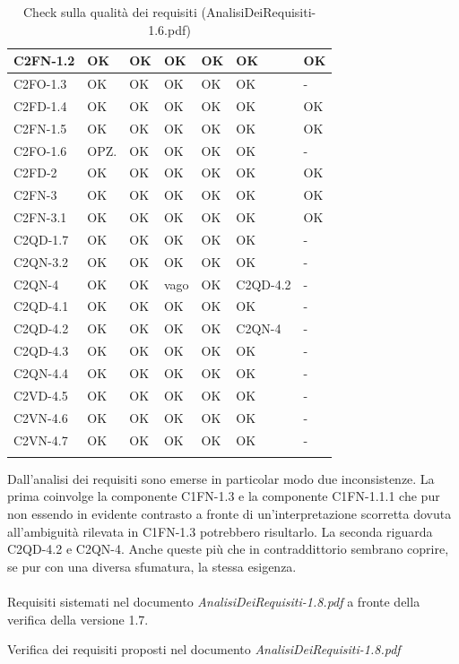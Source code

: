 \begin{footnotesize}
\begin{longtable}{|p{}|p{}|p{}|p{}|p{}|p{}|p{}|}
 C2FN-1.2&  OK&  OK&  OK&  OK&  OK& OK\\ \hline
 C2FO-1.3&  OK&  OK&  OK&  OK&  OK& -\\ \hline
 C2FD-1.4&  OK&  OK&  OK&  OK&  OK& OK\\ \hline
 C2FN-1.5&  OK&  OK&  OK&  OK&  OK& OK\\ \hline
 C2FO-1.6&  OPZ.&  OK&  OK&  OK&  OK& -\\ \hline
 C2FD-2&  OK&  OK&  OK&  OK&  OK& OK\\ \hline
 C2FN-3&  OK&  OK&  OK&  OK&  OK& OK\\ \hline
 C2FN-3.1&  OK&  OK&  OK&  OK&  OK& OK\\ \hline
 C2QD-1.7&  OK&  OK&  OK&  OK&  OK& -\\ \hline
 C2QN-3.2&  OK&  OK&  OK&  OK&  OK& -\\ \hline
 C2QN-4&  OK&  OK&  vago&  OK&  C2QD-4.2& -\\ \hline
 C2QD-4.1&  OK&  OK&  OK&  OK&  OK& -\\ \hline
 C2QD-4.2&  OK&  OK&  OK&  OK&  C2QN-4& -\\ \hline
 C2QD-4.3&  OK&  OK&  OK&  OK&  OK& -\\ \hline
 C2QN-4.4& OK&  OK&  OK&  OK&  OK& -\\ \hline
 C2VD-4.5&  OK&  OK&  OK&  OK&  OK& -\\ \hline
 C2VN-4.6&  OK&  OK&  OK&  OK&  OK& -\\ \hline
 C2VN-4.7&  OK&  OK&  OK&  OK&  OK& -\\ \hline
 
\caption{Check sulla qualit\`a dei requisiti (AnalisiDeiRequisiti-1.6.pdf)}
\end{longtable}
\end{footnotesize}

Dall'analisi dei requisiti sono emerse in particolar modo due inconsistenze. La
prima coinvolge la componente C1FN-1.3 e la componente C1FN-1.1.1 che pur non
essendo in evidente contrasto a fronte di un'interpretazione scorretta dovuta
all'ambiguit\`a rilevata in C1FN-1.3 potrebbero risultarlo.
La seconda riguarda C2QD-4.2 e C2QN-4. Anche queste pi\`u che in contraddittorio
sembrano coprire, se pur con una diversa sfumatura, la stessa esigenza.
\\\\
Requisiti sistemati nel documento \emph{AnalisiDeiRequisiti-1.8.pdf} a fronte
della verifica della versione 1.7.

\newpage
Verifica dei requisiti proposti nel documento \emph{AnalisiDeiRequisiti-1.8.pdf}

